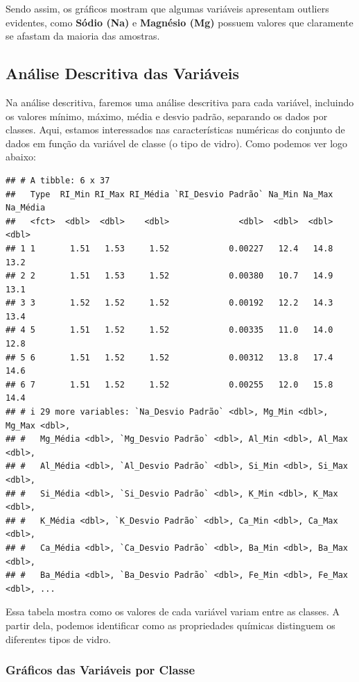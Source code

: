 \documentclass[
]{article}
\begin{document}
Sendo assim, os gráficos mostram que algumas variáveis apresentam
outliers evidentes, como \textbf{Sódio (Na)} e \textbf{Magnésio (Mg)}
possuem valores que claramente se afastam da maioria das amostras.

\subsection{\texorpdfstring{Análise Descritiva das Variáveis
}{Análise Descritiva das Variáveis }}\label{anuxe1lise-descritiva-das-variuxe1veis}

Na análise descritiva, faremos uma análise descritiva para cada
variável, incluindo os valores mínimo, máximo, média e desvio padrão,
separando os dados por classes. Aqui, estamos interessados nas
características numéricas do conjunto de dados em função da variável de
classe (o tipo de vidro). Como podemos ver logo abaixo:

\begin{verbatim}
## # A tibble: 6 x 37
##   Type  RI_Min RI_Max RI_Média `RI_Desvio Padrão` Na_Min Na_Max Na_Média
##   <fct>  <dbl>  <dbl>    <dbl>              <dbl>  <dbl>  <dbl>    <dbl>
## 1 1       1.51   1.53     1.52            0.00227   12.4   14.8     13.2
## 2 2       1.51   1.53     1.52            0.00380   10.7   14.9     13.1
## 3 3       1.52   1.52     1.52            0.00192   12.2   14.3     13.4
## 4 5       1.51   1.52     1.52            0.00335   11.0   14.0     12.8
## 5 6       1.51   1.52     1.52            0.00312   13.8   17.4     14.6
## 6 7       1.51   1.52     1.52            0.00255   12.0   15.8     14.4
## # i 29 more variables: `Na_Desvio Padrão` <dbl>, Mg_Min <dbl>, Mg_Max <dbl>,
## #   Mg_Média <dbl>, `Mg_Desvio Padrão` <dbl>, Al_Min <dbl>, Al_Max <dbl>,
## #   Al_Média <dbl>, `Al_Desvio Padrão` <dbl>, Si_Min <dbl>, Si_Max <dbl>,
## #   Si_Média <dbl>, `Si_Desvio Padrão` <dbl>, K_Min <dbl>, K_Max <dbl>,
## #   K_Média <dbl>, `K_Desvio Padrão` <dbl>, Ca_Min <dbl>, Ca_Max <dbl>,
## #   Ca_Média <dbl>, `Ca_Desvio Padrão` <dbl>, Ba_Min <dbl>, Ba_Max <dbl>,
## #   Ba_Média <dbl>, `Ba_Desvio Padrão` <dbl>, Fe_Min <dbl>, Fe_Max <dbl>, ...
\end{verbatim}

Essa tabela mostra como os valores de cada variável variam entre as
classes. A partir dela, podemos identificar como as propriedades
químicas distinguem os diferentes tipos de vidro.

\subsubsection{Gráficos das Variáveis por
Classe}\label{gruxe1ficos-das-variuxe1veis-por-classe}
\end{document}
